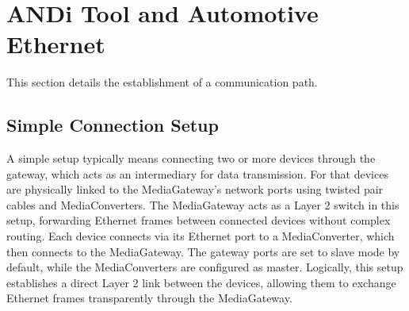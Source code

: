 \section{ANDi Tool and Automotive Ethernet }
\label{sec:mediagateway}

This section details the establishment of a communication path.

\subsection{Simple Connection Setup}
A simple setup typically means connecting two or more devices through the gateway, which acts as an intermediary for data transmission. For that devices are physically linked to the MediaGateway’s network ports using twisted pair cables and MediaConverters. The MediaGateway acts as a Layer 2 switch in this setup, forwarding Ethernet frames between connected devices without complex routing. Each device connects via its Ethernet port to a MediaConverter, which then connects to the MediaGateway. The gateway ports are set to slave mode by default, while the MediaConverters are configured as master. Logically, this setup establishes a direct Layer 2 link between the devices, allowing them to exchange Ethernet frames transparently through the MediaGateway.

